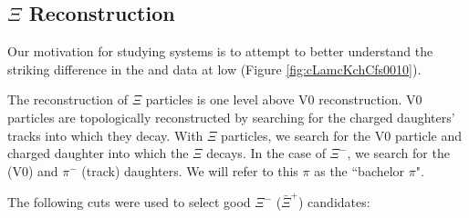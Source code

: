 \documentclass[../AnalysisNoteJBuxton.tex]{subfiles}
\begin{document}
\subsection{$\Xi$ Reconstruction}
\label{CascadeReconstruction}

Our motivation for studying \XiKpm systems is to attempt to better understand the striking difference in the \LamKchP and \LamKchM data at low \kstar (Figure \ref{fig:cLamcKchCfs0010}).

The reconstruction of $\Xi$ particles is one level above V0 reconstruction.  V0 particles are topologically reconstructed by searching for the charged daughters' tracks into which they decay.  With $\Xi$ particles, we search for the V0 particle and charged daughter into which the $\Xi$ decays.  In the case of $\Xi^{-}$, we search for the \Lam (V0) and $\pi^{-}$ (track) daughters.  We will refer to this $\pi$ as the ``bachelor $\pi$".

The following cuts were used to select good $\Xi^{-}$ ($\bar{\Xi}^{+}$) candidates:
\end{document}
